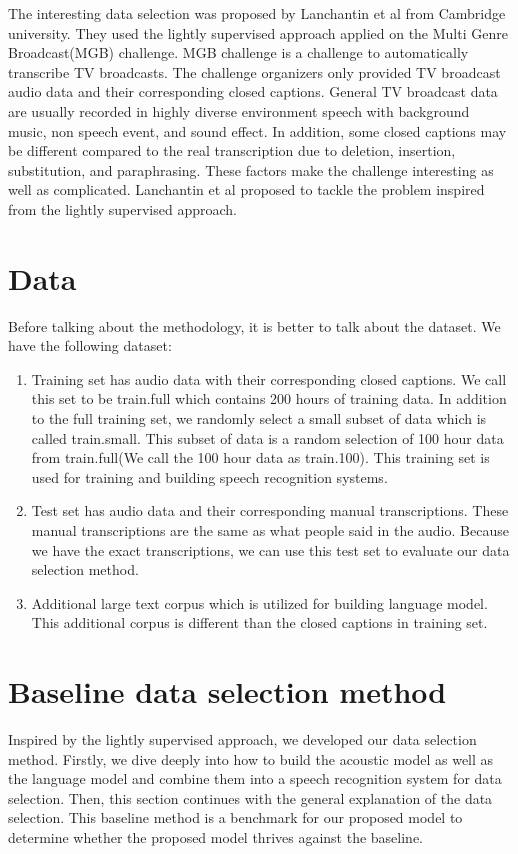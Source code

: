 The interesting data selection was proposed by  Lanchantin et al from Cambridge university\cite{Lanchantin2016}. They used the lightly supervised approach applied on the Multi Genre Broadcast(MGB) challenge. MGB challenge is a challenge to automatically transcribe TV broadcasts. The challenge organizers only provided TV broadcast audio data and their corresponding closed captions. General TV broadcast data are usually recorded in highly diverse environment speech with background music, non speech event, and sound effect. In addition, some closed captions may be different compared to the real transcription due to deletion, insertion, substitution, and paraphrasing. These factors make the challenge interesting as well as complicated. Lanchantin et al proposed to tackle the problem inspired from the lightly supervised approach. 


\section{Data}
Before talking about the methodology, it is better to talk about the dataset. We have the following dataset:
\begin{enumerate}
\item Training set has audio data with their corresponding closed captions. We call this set to be train.full which contains 200 hours of training data. In addition to the full training set, we randomly select a small subset of data which is called train.small. This subset of data is a random selection of 100 hour data from train.full(We call the 100 hour data as train.100). This training set is used for training and building speech recognition systems.
\item Test set has audio data and their corresponding manual transcriptions. These manual transcriptions are the same as what people said in the audio. Because we have the exact transcriptions, we can use this test set to evaluate our data selection method. 
\item Additional large text corpus which is utilized for building language model. This additional corpus is different than the closed captions in training set. 
\end{enumerate}


\section{Baseline data selection method}
Inspired by the lightly supervised approach, we developed our data selection method. Firstly, we dive deeply into how to build the acoustic model as well as the language model and combine them into a speech recognition system for data selection. Then, this section continues with the general explanation of the data selection. This baseline method is a benchmark for our proposed model to determine whether the proposed model thrives against the baseline. 

